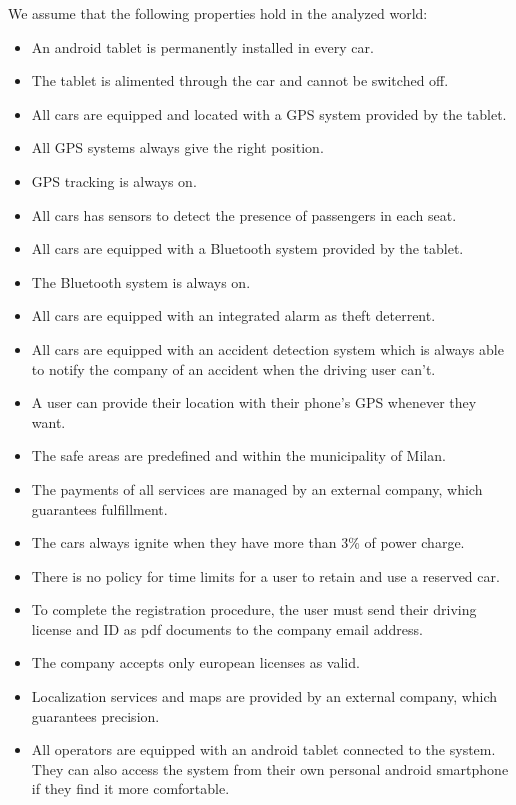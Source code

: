 We assume that the following properties hold in the analyzed world:			
			
			\begin{itemize}
				\item An android tablet is permanently installed in every car. 
				\item The tablet is alimented through the car and cannot be switched off.
				\item All cars are equipped and located with a GPS system provided by the tablet.
				\item All GPS systems always give the right position.
				\item GPS tracking is always on.
				\item All cars has sensors to detect the presence of passengers in each seat.
				\item All cars are equipped with a Bluetooth system provided by the tablet.
				\item The Bluetooth system is always on.
				\item All cars are equipped with an integrated alarm as theft deterrent. %
				\item All cars are equipped with an accident detection system which is always able to notify the company of an accident when the driving user can't. 
				\item A user can provide their location with their phone's GPS whenever they want. 
				\item The safe areas are predefined and within the municipality of Milan.
				\item The payments of all services are managed by an external company, which guarantees fulfillment.
				\item The cars always ignite when they have more than 3\% of power charge.
				\item There is no policy for time limits for a user to retain and use a reserved car. %
				\item To complete the registration procedure, the user must send their driving license and ID as pdf documents to the company email address.
				\item The company accepts only european licenses as valid.
				\item Localization services and maps are provided by an external company, which guarantees precision. 
				\item All operators are equipped with an android tablet connected to the system. They can also access the system from their own personal android smartphone if they find it more comfortable.
			\end{itemize}